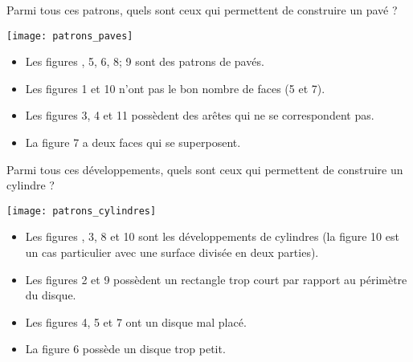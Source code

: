 \bigskip


\begin{exercice} %
   Parmi tous ces patrons, quels sont ceux qui permettent de construire un pavé ?
   \begin{center}
      \texttt{[image: patrons\_paves]}
   \end{center}
\end{exercice}

\begin{corrige}
   \begin{itemize}
      \item Les figures {, 5, 6, 8; 9} sont des patrons de pavés.
      \item Les figures 1 et 10 n'ont pas le bon nombre de faces (5 et 7).
      \item Les figures 3, 4 et 11 possèdent des arêtes qui ne se correspondent pas.
      \item La figure 7 a deux faces qui se superposent.
   \end{itemize}
\end{corrige}

\bigskip


\begin{exercice} %
   Parmi tous ces développements, quels sont ceux qui permettent de construire un cylindre ? \smallskip
   \begin{center}
      \texttt{[image: patrons\_cylindres]}
   \end{center}
\end{exercice}

\begin{corrige}
   \begin{itemize}
      \item Les figures {, 3, 8 et 10 sont les développements de cylindres} (la figure 10 est un cas particulier avec une surface divisée en deux parties).
      \item Les figures 2 et 9 possèdent un rectangle trop court par rapport au périmètre du disque.
      \item Les figures 4, 5 et 7 ont un disque mal placé.
      \item La figure 6 possède un disque trop petit.
   \end{itemize}
\end{corrige}


\Recreation

